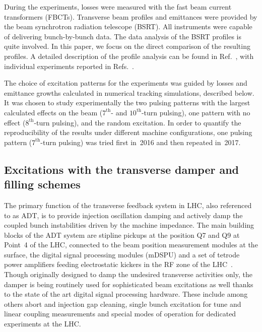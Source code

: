 \documentclass[%
 reprint,
 amsmath,amssymb,
 aps,
prstab,
longbibliography
]{revtex4-1}
\begin{document}
During the experiments, losses were measured with the fast beam
current transformers (FBCTs). Transverse beam profiles and emittances
were provided by the beam synchrotron radiation telescope (BSRT). All
instruments were capable of delivering bunch-by-bunch data. The data
analysis of the BSRT profiles is quite involved. In this paper, we
focus on the direct comparison of the resulting profiles. A detailed
description of the profile analysis can be found in
Ref.~\cite{bsrtprofinj}, with individual experiments reported in
Refs.~\cite{resexmd2016, resexmd2017}.

The choice of excitation patterns for the experiments was guided by
losses and emittance growths calculated in numerical tracking
simulations, described below. It was chosen to study experimentally
the two pulsing patterns with the largest calculated effects on the
beam ($7^{\mathrm{th}}$- and $10^{\mathrm{th}}$-turn pulsing), one
pattern with no effect ($8^{\mathrm{th}}$-turn pulsing), and the
random excitation. In order to quantify the reproducibility of the
results under different machine configurations, one pulsing pattern
($7^{\mathrm{th}}$-turn pulsing) was tried first in~2016 and then
repeated in~2017.


\subsection{Excitations with the transverse damper and filling schemes}
\label{sec:adt}

The primary function of the transverse feedback system in LHC, also
referenced to as ADT, is to provide injection oscillation damping and
actively damp the coupled bunch instabilities driven by the machine
impedance. The main building blocks of the ADT system are stipline
pickups at the position Q7 and Q9 at Point~4 of the LHC, connected to
the beam position measurement modules at the surface, the digital
signal processing modules (mDSPU) and a set of tetrode power
amplifiers feeding electrostatic kickers in the RF zone of the
LHC~\cite{adt_sum_2008,adt_sum_2011}. Though originally designed to
damp the undesired transverse activities only, the damper is being
routinely used for sophisticated beam excitations as well thanks to
the state of the art digital signal processing hardware. These include
among others abort and injection gap cleaning, single bunch excitation
for tune and linear coupling measurements and special modes of
operation for dedicated experiments at the LHC.
\end{document}
